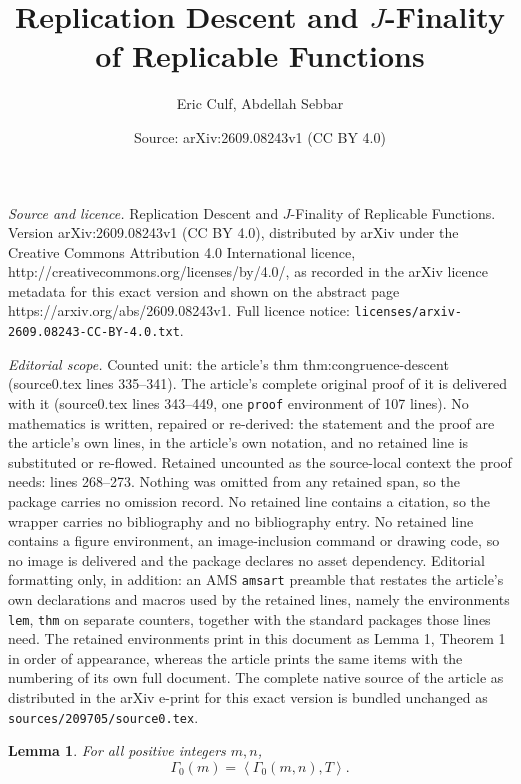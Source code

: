\documentclass[10pt,a4paper]{amsart}
\title{Replication Descent and $J$-Finality of Replicable Functions}
\author{Eric Culf, Abdellah Sebbar}
\date{Source: arXiv:2609.08243v1 (CC BY 4.0)}
\newtheorem{lem}{Lemma}
\begin{document}
\maketitle

\noindent\emph{Source and licence.} Replication Descent and $J$-Finality of Replicable Functions. Version arXiv:2609.08243v1 (CC BY 4.0), distributed by arXiv under the Creative Commons Attribution 4.0 International licence, http://creativecommons.org/licenses/by/4.0/, as recorded in the arXiv licence metadata for this exact version and shown on the abstract page https://arxiv.org/abs/2609.08243v1. Full licence notice: \texttt{licenses/arxiv-2609.08243-CC-BY-4.0.txt}.\par\smallskip

\noindent\textit{Editorial scope.} Counted unit: the article's thm thm:congruence-descent (source0.tex lines 335--341). The article's complete original proof of it is delivered with it (source0.tex lines 343--449, one \texttt{proof} environment of 107 lines). No mathematics is written, repaired or re-derived: the statement and the proof are the article's own lines, in the article's own notation, and no retained line is substituted or re-flowed.  Retained uncounted as the source-local context the proof needs: lines 268--273.  Nothing was omitted from any retained span, so the package carries no omission record.  No retained line contains a citation, so the wrapper carries no bibliography and no bibliography entry.  No retained line contains a figure environment, an image-inclusion command or drawing code, so no image is delivered and the package declares no asset dependency.  Editorial formatting only, in addition: an AMS \texttt{amsart} preamble that restates the article's own declarations and macros used by the retained lines, namely the environments \texttt{lem}, \texttt{thm} on separate counters, together with the standard packages those lines need.  The retained environments print in this document as Lemma 1, Theorem 1 in order of appearance, whereas the article prints the same items with the numbering of its own full document.  The complete native source of the article as distributed in the arXiv e-print for this exact version is bundled unchanged as \texttt{sources/209705/source0.tex}.
\begin{lem}\label{lem:generation}
For all positive integers $m,n$,
\begin{equation}\label{eq:generation}
\Gamma_0(m)=\left\langle\Gamma_0(m,n),T\right\rangle.
\end{equation}
\end{lem}
\end{document}
